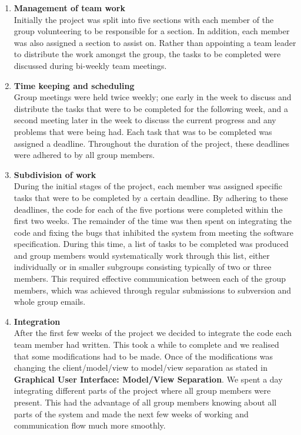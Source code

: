 \begin{enumerate}

	\item \textbf{Management of team work} \\
		Initially the project was split into five sections with each member of the group volunteering 
		to be responsible for a section. In addition, each member was also assigned a section to 
		assist on. Rather than appointing a team leader to distribute the work amongst the group, the 
		tasks to be completed were discussed during bi-weekly team meetings.
		
	\item \textbf{Time keeping and scheduling} \\
		Group meetings were held twice weekly; one early in the week to discuss and distribute the 
		tasks that were to be completed for the following week, and a second meeting later in the week
		to discuss the current progress and any problems that were being had. Each task that was to be
		completed was assigned a deadline. Throughout the duration of the project, these deadlines were
		adhered to by all group members.
	
	\item \textbf{Subdivision of work} \\
		During the initial stages of the project, each member was assigned specific tasks that were to be
		completed by a certain deadline. By adhering to these deadlines, the code for each of the five 
		portions were completed within the first two weeks. The remainder of the time was then spent on
		integrating the code and fixing the bugs that inhibited the system from meeting the software
		specification. During this time, a list of tasks to be completed was produced and group members 
		would systematically work through this list, either individually or in smaller subgroups consisting
		typically of two or three members. This required effective communication between each of the group
		members, which was achieved through regular submissions to subversion and whole group emails.
		
	\item \textbf{Integration} \\
		After the first few weeks of the project we decided to integrate the code each team member had
		written. This took a while to complete and we realised that some modifications had to be made.
		Once of the modifications was changing the client/model/view to model/view separation as stated 
		in \textbf{Graphical User Interface: Model/View Separation}. We spent a day integrating	different 
		parts of the project where all group members were present. This had the advantage of all group
		members knowing about all parts of the system and made the next few weeks of working and 
		communication flow much more smoothly. 
 
\end{enumerate}
